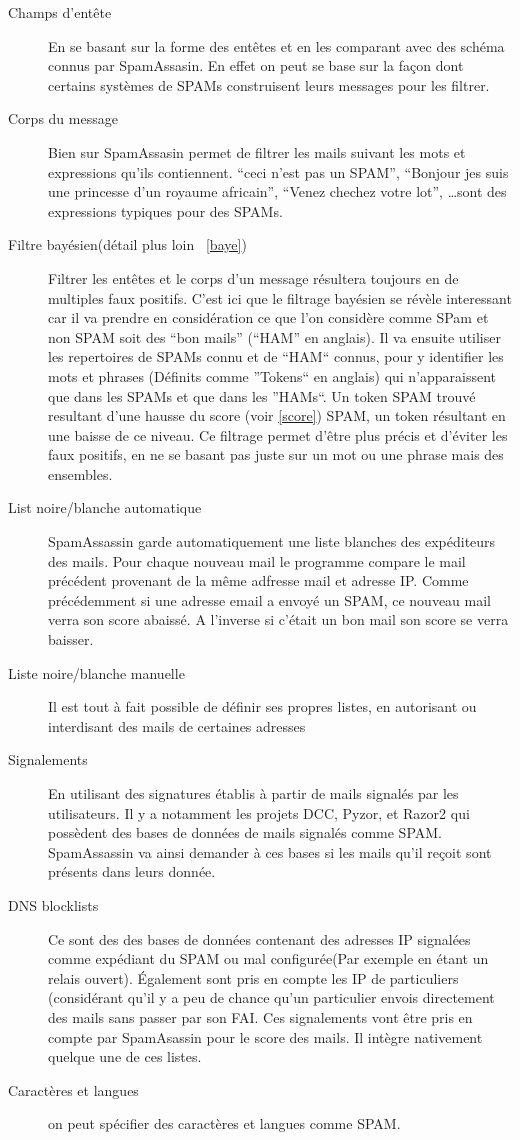 \documentclass[a4paper,11pt]{article}
\begin{document}
\begin{description}
 \item [Champs d'entête] En se basant sur la forme des entêtes et en les comparant avec des schéma connus par SpamAssasin. En effet 
 on peut se base sur la façon dont certains systèmes de SPAMs construisent leurs messages pour les filtrer. 
 \item [Corps du message] Bien sur SpamAssasin permet de filtrer les mails suivant les mots et expressions qu'ils contiennent. 
 ``ceci n'est pas un SPAM'', ``Bonjour jes suis une princesse d'un royaume africain'', ``Venez chechez votre lot'', \dots sont des expressions
 typiques pour des SPAMs. 
 \item [Filtre bayésien(détail plus loin ~\ref{baye})] Filtrer les entêtes et le corps d'un message résultera toujours en de multiples faux positifs. C'est ici que le filtrage 
 bayésien se révèle interessant car il va prendre en considération ce que l'on considère comme SPam et non SPAM soit des ``bon mails'' (``HAM'' en anglais).
 Il va ensuite utiliser les repertoires de SPAMs connu et de ``HAM``  connus, pour y identifier les mots et phrases (Définits comme ''Tokens`` en anglais)
 qui n'apparaissent que dans les SPAMs et que dans les ''HAMs``.
 Un token SPAM trouvé resultant d'une hausse du score (voir \ref{score}) SPAM, un token résultant en une baisse de ce niveau. Ce filtrage permet d'être plus précis et d'éviter les faux positifs, 
 en ne se basant pas juste sur un mot ou une phrase mais des ensembles. 
 \item [List noire/blanche automatique] SpamAssassin garde automatiquement une liste blanches des expéditeurs des mails.
 Pour chaque nouveau mail le programme compare le mail précédent provenant de la même adfresse mail et adresse IP.
 Comme précédemment si une adresse email a envoyé un SPAM, ce nouveau mail verra son score abaissé. A l'inverse si c'était un bon mail son score 
 se verra baisser.
 \item [Liste noire/blanche manuelle] Il est tout à fait possible de définir ses propres listes, en autorisant ou 
 interdisant des mails de certaines adresses
 \item [Signalements] En utilisant des signatures établis à partir de mails signalés par les utilisateurs. Il y a notamment les projets DCC, Pyzor, et Razor2
 qui possèdent des bases de données de mails signalés comme SPAM. SpamAssassin va ainsi demander à ces bases si les mails qu'il reçoit 
 sont présents dans leurs donnée.
 \item [DNS blocklists] Ce sont des des bases de données contenant des adresses IP signalées comme expédiant du SPAM ou mal 
 configurée(Par exemple en étant un relais ouvert). Également sont pris en compte les IP de particuliers (considérant qu'il y a peu de chance
qu'un particulier envois directement des mails sans passer par son FAI. Ces signalements vont être pris en compte par SpamAsassin pour le score des mails.
Il intègre nativement quelque une de ces listes.
\item [Caractères et langues] on peut spécifier des caractères et langues comme SPAM.


\end{description}
\end{document}
